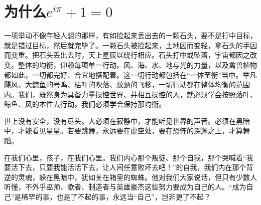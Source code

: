 \section{为什么$e^{i\pi} + 1 = 0$}
一项举动不像年轻人想的那样，有如捡起来丢出去的一颗石头，要不是打中目标，就是错过目标，然后就完毕了。一颗石头被捡起来，土地因而变轻，拿石头的手因而变重。把石头丢出去时，天上星辰以绕行相应。石头打中或坠落，宇宙都因之改变。整体的均衡，仰赖每项单一行动。风、海、水、地与光的力量，以及禽兽植物都如此，一切都完好、合宜地搭配着。这一切行动都包括在“一体至衡”当中。举凡飓风、大鲸鱼的号鸣、枯叶的吹落、蚊蚋的飞移，一切行动都在整体均衡的范围内。我们，既然身为具备力量操控世界、并相互操控的人，就必须学会按照落叶、鲸鱼、风的本性去行动。我们必须学会保持那均衡。


世上没有安全，没有尽头。人必须在寂静中，才能听见世界的声音。必须在黑暗中，才能看见星星。若要跳舞，永远要在虚空处，要在恐怖的深渊之上，才算舞蹈。


在我们心里，孩子，在我们心里。我们内心那个叛徒、那个自我，那个哭喊着“我要活下去，只要我能活活下去，让人间任意败坏去吧！”的自我，我们内在那个背逆的灵魂，躲在黑暗中，犹如关在箱里的蜘蛛。他对我们大家说话，但只有少数人听懂，不外乎巫师、歌者、制造者与英雄豪杰这些努力要成为自己的人。“成为自己”是稀罕的事，也是了不起的事，永远当“自己”，岂非更了不起？\cite{LeGuin}

